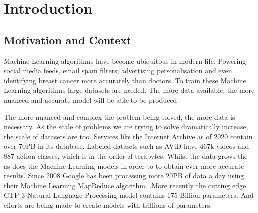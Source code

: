 
\section{Introduction}

\subsection{Motivation and Context}
Machine Learning algorithms have become ubiquitous in modern life. Powering
social media feeds, email spam filters, advertising personalisation and even
identifying breast cancer more accurately than doctors. \cite{Mammograms2020} To
train these Machine Learning algorithms large datasets are needed. The more data
available, the more nuanced and accurate model will be able to be produced

The more
nuanced and complex the problem being solved, the more data is necessary. As the
scale of problems we are trying to solve dramatically increase, the scale of
datasets are too. Services like the Internet Archive as of 2020 contain
over 70PB in its database. Labeled datasets such as AViD have 467k videos and
887 action classes, which is in the order of terabytes.
\cite{piergiovanni2020avid} 
Whilst the data grows the as does the Machine Learning models in order to to
obtain ever more accurate results. Since 2008 Google has been processing more
20PB of data a day using their Machine Learning MapReduce algorithm.
\cite{googlemapreduce2008}.More recently the cutting edge GTP-3 Natural Language Processing
model contains 175 Billion parameters. \cite{fewshowlearners2020gpt} And efforts
are being made to create models with trillions of parameters.
\cite{rajbhandari2020zero}
\par

